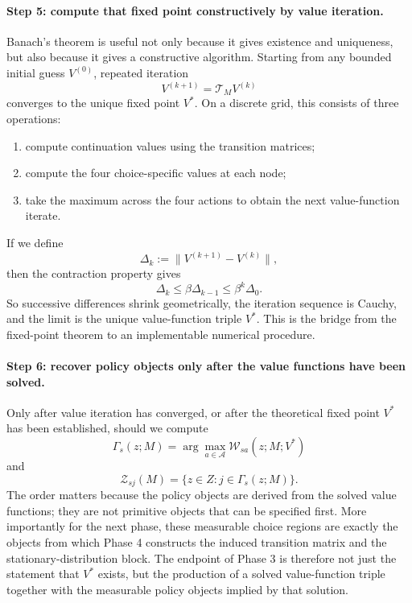 \paragraph{Step 5: compute that fixed point constructively by value iteration.}
Banach's theorem is useful not only because it gives existence and uniqueness, but also because it gives a constructive algorithm. Starting from any bounded initial guess $V^{(0)}$, repeated iteration
\[
V^{(k+1)}=\mathcal T_MV^{(k)}
\]
converges to the unique fixed point $V^*$. On a discrete grid, this consists of three operations:
\begin{enumerate}
    \item compute continuation values using the transition matrices;
    \item compute the four choice-specific values at each node;
    \item take the maximum across the four actions to obtain the next value-function iterate.
\end{enumerate}
If we define
\[
\Delta_k:=\|V^{(k+1)}-V^{(k)}\|,
\]
then the contraction property gives
\[
\Delta_k\le \beta\Delta_{k-1}\le \beta^k\Delta_0.
\]
So successive differences shrink geometrically, the iteration sequence is Cauchy, and the limit is the unique value-function triple $V^*$. This is the bridge from the fixed-point theorem to an implementable numerical procedure.

\paragraph{Step 6: recover policy objects only after the value functions have been solved.}
Only after value iteration has converged, or after the theoretical fixed point $V^*$ has been established, should we compute
\[
\Gamma_s(z;M)=\arg\max_{a\in\mathcal A}\mathcal W_{sa}(z;M;V^*)
\]
and
\[
\mathcal Z_{sj}(M)=\{z\in Z:j\in\Gamma_s(z;M)\}.
\]
The order matters because the policy objects are derived from the solved value functions; they are not primitive objects that can be specified first. More importantly for the next phase, these measurable choice regions are exactly the objects from which Phase 4 constructs the induced transition matrix and the stationary-distribution block. The endpoint of Phase 3 is therefore not just the statement that $V^*$ exists, but the production of a solved value-function triple together with the measurable policy objects implied by that solution.


